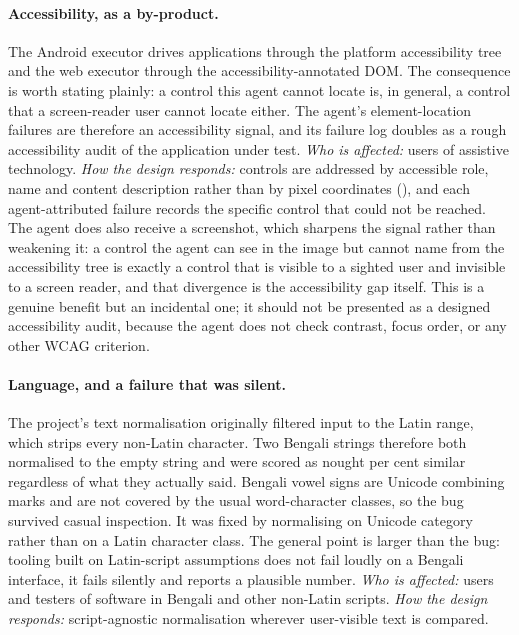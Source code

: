 \paragraph{Accessibility, as a by-product.} The Android executor drives
applications through the platform accessibility tree and the web executor
through the accessibility-annotated DOM. The consequence is worth stating
plainly: a control this agent cannot locate is, in general, a control that a
screen-reader user cannot locate either. The agent's element-location failures
are therefore an accessibility signal, and its failure log doubles as a rough
accessibility audit of the application under test.
\emph{Who is affected:} users of assistive technology.
\emph{How the design responds:} controls are addressed by accessible role, name and content description rather than by pixel coordinates (), and each agent-attributed failure records the specific control that could not be reached. The agent does also receive a screenshot, which sharpens the signal rather than weakening it: a control the agent can see in the image but cannot name from the accessibility tree is exactly a control that is visible to a sighted user and invisible to a screen reader, and that divergence is the accessibility gap itself. This is a genuine benefit but an incidental
one; it should not be presented as a designed accessibility audit, because the
agent does not check contrast, focus order, or any other WCAG criterion.

\paragraph{Language, and a failure that was silent.} The project's text
normalisation originally filtered input to the Latin range, which strips every
non-Latin character. Two Bengali strings therefore both normalised to the empty
string and were scored as nought per cent similar regardless of what they
actually said. Bengali vowel signs are Unicode combining marks and are not
covered by the usual word-character classes, so the bug survived casual
inspection. It was fixed by normalising on Unicode category rather than on a
Latin character class. The general point is larger than the bug: tooling built
on Latin-script assumptions does not fail loudly on a Bengali interface, it
fails silently and reports a plausible number.
\emph{Who is affected:} users and testers of software in Bengali and other
non-Latin scripts. \emph{How the design responds:} script-agnostic
normalisation wherever user-visible text is compared.

